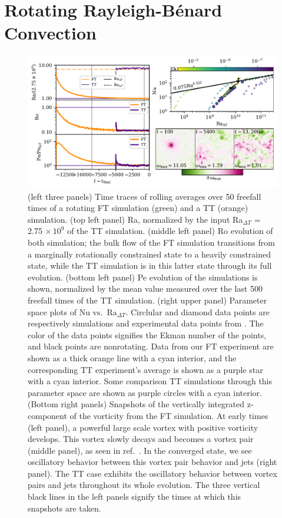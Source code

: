 \documentclass[aps, pre, onecolumn, nofootinbib, notitlepage, groupedaddress, amsfonts, amssymb, amsmath, longbibliography, superscriptaddress]{revtex4-1}
\newcommand{\RB}{Rayleigh-B\'{e}nard }
\begin{document}
\section{Rotating \RB Convection}
\label{sec:rotating_results}
\begin{figure}
\includegraphics[width=\textwidth]{./figs/rotating_panels.pdf}
\caption{ 
	(left three panels) Time traces of rolling averages over 50 freefall times of a rotating FT simulation (green) and a TT (orange) simulation.
	(top left panel) Ra, normalized by the input Ra$_{\Delta T}$ = 2.75$\,\times 10^9$ of the TT simulation.
	(middle left panel) Ro evolution of both simulation; the bulk flow of the FT simulation transitions from a marginally rotationally constrained state to a heavily constrained state, while the TT simulation is in this latter state through its full evolution.
	(bottom left panel) Pe evolution of the simulations is shown, normalized by the mean value measured over the last 500 freefall times of the TT simulation.
	(right upper panel) Parameter space plots of Nu vs.~Ra$_{\Delta T}$.
	Circlular and diamond data points are respectively simulations and experimental data points from \cite{cheng&all2015}.
	The color of the data points signifies the Ekman number of the points, and black points are nonrotating.
	Data from our FT experiment are shown as a thick orange line with a cyan interior, and the corresponding TT experiment's average is shown as a purple star with a cyan interior.
	Some comparison TT simulations through this parameter space are shown as purple circles with a cyan interior.
	(Bottom right panels) Snapshots of the vertically integrated z-component of the vorticity from the FT simulation.
	At early times (left panel), a powerful large scale vortex with positive vorticity develops.
	This vortex slowly decays and becomes a vortex pair (middle panel), as seen in ref.~\cite{stellmach&all2014}.
	In the converged state, we see oscillatory behavior between this vortex pair behavior and jets (right panel).
	The TT case exhibits the oscillatory behavior between vortex pairs and jets throughout its whole evolution.
	The three vertical black lines in the left panels signify the times at which this snapshots are taken.
\label{fig:rotating_panels} }
\end{figure}
\end{document}
